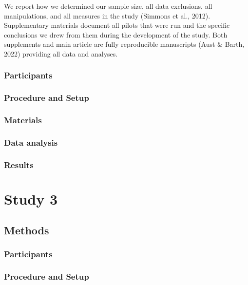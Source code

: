 \documentclass[
  man]{apa6}
\begin{document}
We report how we determined our sample size, all data exclusions, all manipulations, and all measures in the study (Simmons et al., 2012). Supplementary materials document all pilots that were run and the specific conclusions we drew from them during the development of the study. Both supplements and main article are fully reproducible manuscripts (Aust \& Barth, 2022) providing all data and analyses.

\subsubsection{Participants}\label{participants-1}

\subsubsection{Procedure and Setup}\label{procedure-and-setup-1}

\subsubsection{Materials}\label{materials-1}

\subsubsection{Data analysis}\label{data-analysis-1}

\subsubsection{Results}\label{results-1}

\section{Study 3}\label{study-3}

\subsection{Methods}\label{methods-2}

\subsubsection{Participants}\label{participants-2}

\subsubsection{Procedure and Setup}\label{procedure-and-setup-2}
\end{document}
